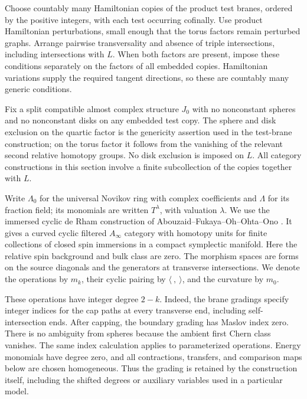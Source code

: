 \documentclass[11pt]{article}
\numberwithin{equation}{section}
\theoremstyle{definition}
\theoremstyle{remark}
\begin{document}
Choose countably many Hamiltonian copies of the product test branes,
ordered by the positive integers, with each test occurring cofinally.
Use product Hamiltonian perturbations, small enough that the torus
factors remain perturbed graphs.  Arrange pairwise transversality and
absence of triple intersections, including intersections with $L$.
When both factors are present, impose these conditions separately on
the factors of all embedded copies.  Hamiltonian variations supply the
required tangent directions, so these are countably many generic
conditions.

Fix a split compatible almost complex structure $J_0$ with no
nonconstant spheres and no nonconstant disks on any embedded test
copy.  The sphere and disk exclusion on the quartic factor is the
genericity assertion used in the test-brane construction; on the torus
factor it follows from the vanishing of the relevant second relative
homotopy groups.  No disk exclusion is imposed on $L$.  All category
constructions in this section involve a finite subcollection of the
copies together with $L$.

Write $\Lambda_0$ for the universal Novikov ring with complex
coefficients and $\Lambda$ for its fraction field; its monomials are
written $T^\lambda$, with valuation $\lambda$.  We use the immersed
cyclic de Rham construction of Abouzaid--Fukaya--Oh--Ohta--Ono
\cite[Theorems~9.3 and~9.6]{AFOOO2026}.  It gives a curved cyclic
filtered $A_\infty$ category with homotopy units for finite collections
of closed spin immersions in a compact symplectic manifold.  Here the
relative spin background and bulk class are zero.  The morphism spaces
are forms on the source diagonals and the generators at transverse
intersections.  We denote the operations by $m_k$, their cyclic pairing
by $\langle\ ,\ \rangle$, and the curvature by $m_0$.

These operations have integer degree $2-k$.  Indeed, the brane
gradings specify integer indices for the cap paths at every transverse
end, including self-intersection ends.  After capping, the boundary
grading has Maslov index zero.  There is no ambiguity from spheres
because the ambient first Chern class vanishes.  The same index
calculation applies to parameterized operations.  Energy monomials
have degree zero, and all contractions, transfers, and comparison
maps below are chosen homogeneous.  Thus the grading is retained by
the construction itself, including the shifted degrees or auxiliary
variables used in a particular model.
\end{document}
